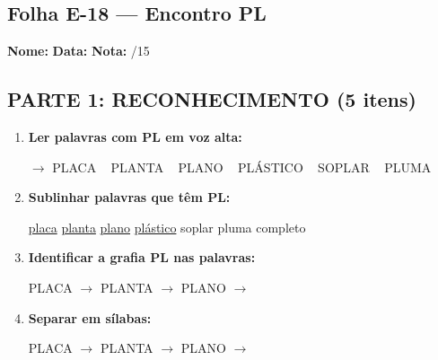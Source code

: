 \subsection{Folha E-18 --- Encontro PL}
\begin{exercicio}



\noindent\textbf{Nome:} \underline{\hspace{3.2cm}} \quad \textbf{Data:} \underline{\hspace{1.6cm}} \quad \textbf{Nota:} \underline{\hspace{0.9cm}}/15


\subsection*{PARTE 1: RECONHECIMENTO (5 itens)}

\begin{enumerate}

  \item \textbf{Ler palavras com PL em voz alta:}
  \begin{center}
  $\rightarrow$ PLACA ~ PLANTA ~ PLANO ~ PLÁSTICO ~ SOPLAR ~ PLUMA
  \end{center}

  \item \textbf{Sublinhar palavras que têm PL:}

\begin{center}
  \uline{placa} \quad \uline{planta} \quad \uline{plano} \quad \uline{plástico} \quad soplar \quad pluma \quad completo
\end{center}

  \item \textbf{Identificar a grafia PL nas palavras:}
  \begin{center}
  PLACA $\rightarrow$ \underline{\hspace{1cm}} \quad PLANTA $\rightarrow$ \underline{\hspace{1cm}} \quad PLANO $\rightarrow$ \underline{\hspace{1cm}}
  \end{center}

  \item \textbf{Separar em sílabas:}
  \begin{center}
  PLACA $\rightarrow$ \underline{\hspace{1.2cm}} \quad PLANTA $\rightarrow$ \underline{\hspace{1.2cm}} \quad PLANO $\rightarrow$ \underline{\hspace{1.2cm}}
  \end{center}


\end{enumerate}
\end{exercicio}
